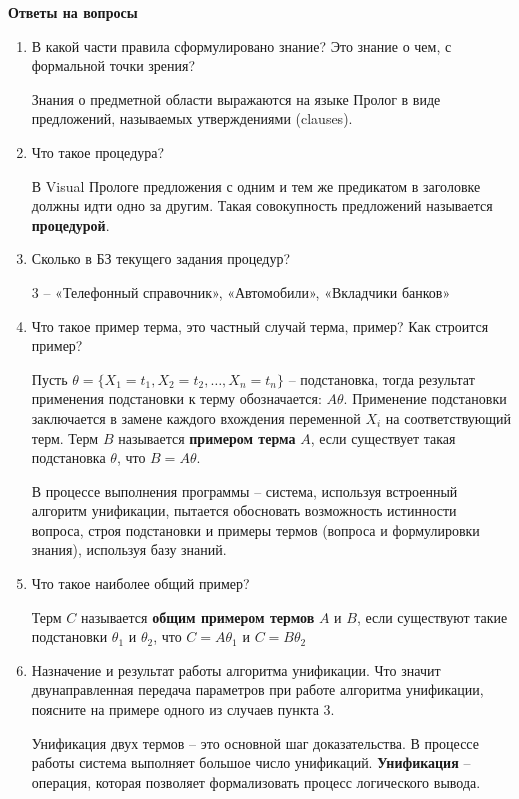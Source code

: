 \documentclass[a4paper,14pt]{extreport} %
\begin{document}
\hfill

\textbf{Ответы на вопросы}

\begin{enumerate} 
\item В какой части правила сформулировано знание? Это знание о чем, с формальной точки зрения?

Знания о предметной области выражаются на языке Пролог в виде предложений, называемых утверждениями (clauses). 

\item Что такое процедура?

В Visual Прологе предложения с одним и тем же предикатом в заголовке должны идти одно за другим. Такая совокупность предложений называется \textbf{процедурой}. 

\item Сколько в БЗ  текущего задания процедур?

3 -- «Телефонный справочник», «Автомобили», «Вкладчики банков»

\item Что такое пример терма, это частный случай терма, пример? Как строится пример? 

Пусть $\theta = \{ X_1 = t_1, X_2= t_2, … , X_n = t_n \}$ -- подстановка,  тогда результат применения подстановки к терму обозначается: $A\theta$. Применение подстановки заключается в замене каждого вхождения переменной $X_i$  на соответствующий терм. Терм $B$ называется \textbf{примером терма} $A$, если существует такая подстановка $\theta$, что $B=A\theta$.

В процессе выполнения программы -- система, используя встроенный алгоритм унификации, пытается обосновать возможность истинности вопроса, строя подстановки и примеры термов (вопроса и формулировки знания), используя базу знаний. 

\item Что такое наиболее общий пример?

Терм $C$ называется \textbf{общим примером термов} $A$ и $B$, если существуют такие подстановки $\theta_1$ и $\theta_2$, что $C = A\theta_1$  и  $C = B\theta_2$

\item Назначение и результат работы алгоритма унификации. Что значит двунаправленная передача параметров при работе алгоритма унификации, поясните на примере одного из случаев пункта  3.

Унификация двух термов -- это основной шаг доказательства. В процессе работы система выполняет большое число унификаций.
\textbf{Унификация} -- операция, которая позволяет формализовать процесс логического вывода. 


\end{enumerate}
\end{document}
